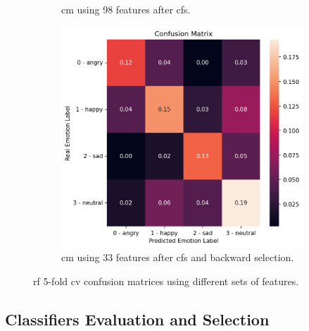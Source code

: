\begin{figure}[H]
\begin{subfigure}{.5\textwidth}
		\caption{\ac{cm} using 98 features after \ac{cfs}.}
	\end{subfigure}
	\newline
	\centering
	\begin{subfigure}{.5\textwidth}
		\centering
		\includegraphics[width=\linewidth]{figs/appendix/feature_selection/cmThird.png}
		\caption{\ac{cm} using 33 features after \ac{cfs} and backward selection.}
	\end{subfigure}
	\caption{\ac{rf} 5-fold \ac{cv} confusion matrices using different sets of features.}
\end{figure}


\subsection{Classifiers Evaluation and Selection} \label{app:5}


